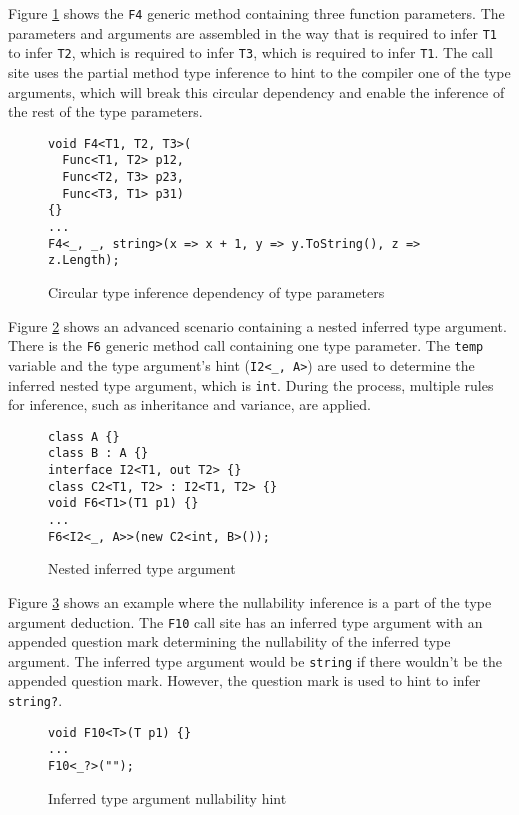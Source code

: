Figure \ref{img73:example1} shows the \texttt{F4} generic method containing three function parameters. 
The parameters and arguments are assembled in the way that is required to infer \texttt{T1} to infer \texttt{T2}, which is required to infer \texttt{T3}, which is required to infer \texttt{T1}. 
The call site uses the partial method type inference to hint to the compiler one of the type arguments, which will break this circular dependency and enable the inference of the rest of the type parameters.
\begin{figure}[!h]
\begin{lstlisting}[style=csharp, showstringspaces=false]
void F4<T1, T2, T3>(
  Func<T1, T2> p12, 
  Func<T2, T3> p23, 
  Func<T3, T1> p31) 
{}
...
F4<_, _, string>(x => x + 1, y => y.ToString(), z => z.Length); 
\end{lstlisting}
\caption{Circular type inference dependency of type parameters}
\label{img73:example1}
\end{figure}
\par
Figure \ref{img74:example2} shows an advanced scenario containing a nested inferred type argument.
There is the \texttt{F6} generic method call containing one type parameter.
The \texttt{temp} variable and the type argument’s hint (\texttt{I2<\_, A>}) are used to determine the inferred nested type argument, which is \texttt{int}.
During the process, multiple rules for inference, such as inheritance and variance, are applied.
\begin{figure}[!h]
\begin{lstlisting}[style=csharp, showstringspaces=false]
class A {}
class B : A {}
interface I2<T1, out T2> {}
class C2<T1, T2> : I2<T1, T2> {}
void F6<T1>(T1 p1) {}
...
F6<I2<_, A>>(new C2<int, B>());
\end{lstlisting}
\caption{Nested inferred type argument}
\label{img74:example2}
\end{figure}
\par
Figure \ref{img75:example3} shows an example where the nullability inference is a part of the type argument deduction.
The \texttt{F10} call site has an inferred type argument with an appended question mark determining the nullability of the inferred type argument. 
The inferred type argument would be \texttt{string} if there wouldn't be the appended question mark. 
However, the question mark is used to hint to infer \texttt{string?}.
\begin{figure}[!h]
\begin{lstlisting}[style=csharp, showstringspaces=false]
void F10<T>(T p1) {}
...
F10<_?>("");
\end{lstlisting}
\caption{Inferred type argument nullability hint}
\label{img75:example3}
\end{figure}
